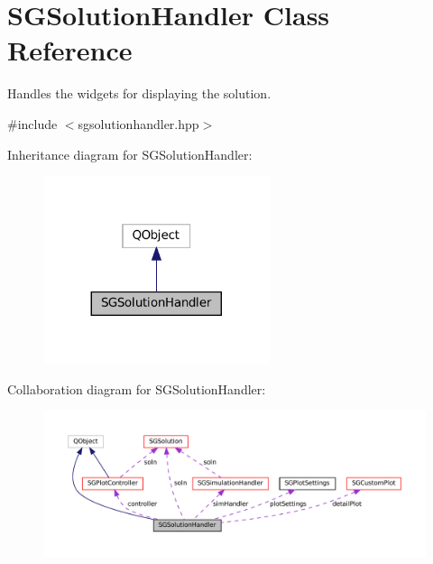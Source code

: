 \hypertarget{classSGSolutionHandler}{}\section{S\+G\+Solution\+Handler Class Reference}
\label{classSGSolutionHandler}


Handles the widgets for displaying the solution.  




{\ttfamily \#include $<$sgsolutionhandler.\+hpp$>$}



Inheritance diagram for S\+G\+Solution\+Handler\+:
\nopagebreak
\begin{figure}[H]
\begin{center}
\leavevmode
\includegraphics[width=188pt]{classSGSolutionHandler__inherit__graph}
\end{center}
\end{figure}


Collaboration diagram for S\+G\+Solution\+Handler\+:
\nopagebreak
\begin{figure}[H]
\begin{center}
\leavevmode
\includegraphics[width=350pt]{classSGSolutionHandler__coll__graph}
\end{center}
\end{figure}
